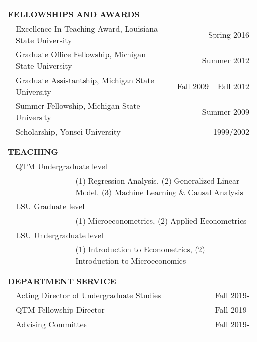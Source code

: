 \documentclass[10pt]{article}
\begin{document}
\begin{center}
\begin{tabular}{lllr}
\multicolumn{4}{p{500pt}}{}\\
\multicolumn{4}{l}{{\Large \textbf{F}}\textbf{ELLOWSHIPS} \textbf{AND}
{\Large \textbf{A}}\textbf{WARDS}} \vspace{0.1cm}\\
& \multicolumn{2}{l}{Excellence In Teaching Award, Louisiana State University}& \multicolumn{1}{r}{Spring 2016} \\
& \multicolumn{2}{l}{Graduate Office Fellowship, Michigan State University}& \multicolumn{1}{r}{Summer 2012} \\
& \multicolumn{2}{l}{Graduate Assistantship, Michigan State University} &
\multicolumn{1}{r}{Fall 2009 -- Fall 2012}\\
& \multicolumn{2}{l}{Summer Fellowship, Michigan State University}& \multicolumn{1}{r}{Summer 2009} \\
& \multicolumn{2}{l}{Scholarship, Yonsei University} &
\multicolumn{1}{r}{1999/2002}\\
\multicolumn{4}{l}{} \\\\
\multicolumn{4}{l}{{\Large \textbf{T}}\textbf{EACHING}}\\
& \multicolumn{3}{l}{QTM Undergraduate level}\\
&& \multicolumn{2}{l}{(1) Regression Analysis, (2) Generalized Linear Model, (3) Machine Learning \& Causal Analysis}\\
& \multicolumn{3}{l}{LSU Graduate level}\\
&& \multicolumn{2}{l}{(1) Microeconometrics, (2) Applied Econometrics}\\
& \multicolumn{3}{l}{LSU Undergraduate level}\\
&& \multicolumn{2}{l}{(1) Introduction to Econometrics, (2) Introduction to Microeconomics}\\
\multicolumn{4}{l}{} \\\\
\multicolumn{4}{l}{{\Large \textbf{D}}\textbf{EPARTMENT} {\Large \textbf{S}}\textbf{ERVICE}}\\
& \multicolumn{2}{l}{Acting Director of Undergraduate Studies}&\multicolumn{1}{r}{Fall 2019-}\\
& \multicolumn{2}{l}{QTM Fellowship Director}&\multicolumn{1}{r}{Fall 2019-}\\
& \multicolumn{2}{l}{Advising Committee}&\multicolumn{1}{r}{Fall 2019-}\\\\\\

\end{tabular}
\end{center}
\end{document}
